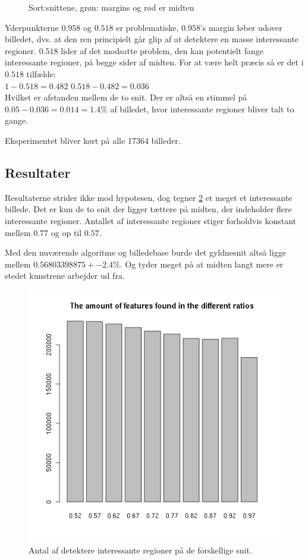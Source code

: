 {\begin{figure}[h!]
\begin{center}
	\end{center}
	\caption{Sort:snittene, grøn: margins og rød er midten}
	\label{snitogmargin}
\end{figure}
Yderpunkterne $0.958$ og $0.518$ er problematiske, $0.958$'s margin
løber udover billedet, dvs. at den ren principielt går glip af at
detektere en masse interessante regioner.
$0.518$ lider af det modsatte problem, den kan potentielt fange
interessante regioner, på begge sider af midten.
For at være helt præcis så er det i $0.518$ tilfælde:\\
$1-0.518 = 0.482$
$0.518-0.482=0.036$\\
Hvilket er afstanden mellem de to snit.
Der er altså en stimmel på $0.05-0.036 = 0.014 = 1.4\%$ af billedet,
hvor interessante regioner bliver talt to gange.

Eksperimentet bliver kørt på alle 17364 billeder.
\newpage
\subsection{Resultater}
Resultaterne strider ikke mod hypotesen, dog tegner \ref{diffratios}
et meget et interessante billede. Det er kun de to snit der ligger
tættere på midten, der indeholder flere interessante regioner.
Antallet af interessante regioner stiger forholdvis konstant mellem
$0.77$ og op til $0.57$.

Med den nuværende algoritme og billedebase burde det gyldnesnit
altså ligge mellem $0.56803398875 +- 2.4\%$.
Og tyder meget på at midten langt mere er stedet kunstrene arbejder
ud fra.
\begin{figure}[h!]
	\begin{center}
		\includegraphics[scale=0.5]{afsnit/resultater/billeder/featsperratio.png}
	\end{center}
	\caption{Antal af detektere interessante regioner på de forskellige snit.}
	\label{diffratios}
\end{figure}




}
